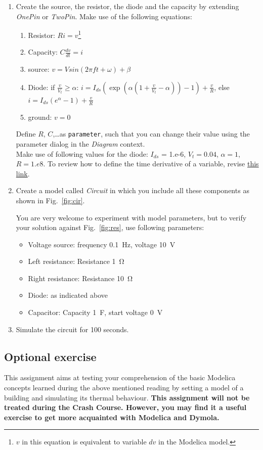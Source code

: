 \documentclass[10pt,a4paper]{article}
\begin{document}
\begin{enumerate}
	\item Create the source, the resistor, the diode and the capacity by extending \textit{OnePin} or \textit{TwoPin}. Make use of the following equations:
	\begin{enumerate}
		\item Resistor: $R i = v$\footnote{$v$ in this equation is equivalent to variable $dv$ in the Modelica model.}
		\item Capacity: $C \frac{d v}{dt} = i$
		\item source: $v = V sin( 2 \pi f t + \omega) + \beta$
		\item Diode: if $ \frac{v}{V_t} \geq \alpha$: $i = I_{ds} \left( \exp\left(\alpha \left( 1 + \frac{v}{V_t} - \alpha \right)\right) - 1\right) + \frac{v}{R}$, else $i = I_{ds} (e^\alpha - 1) + \frac{v}{R}$
		\item ground: $ v = 0$
	\end{enumerate}
	Define $R$, $C$,\ldots as \texttt{parameter}, such that you can change their value using the parameter dialog in the \textit{Diagram} context.\\
	Make use of following values for the diode: $I_{ds}$ = 1.e-6, $V_t=0.04$, 
	$\alpha=1$, $R=1.e8$.
	To review how to define the time derivative of a variable, revise 
	\href{http://book.xogeny.com/behavior/equations/first_order/}{this link}.
	\item Create a model called \textit{Circuit} in which you include all these 
	components as shown in Fig.~\ref{fig:cir}.
	
	You are very welcome to experiment with model parameters, but to verify 
	your solution against Fig.~\ref{fig:res}, use following parameters:
	\begin{itemize}
		\item Voltage source: frequency \SI{0.1}{\hertz}, voltage \SI{10}{\volt}
		\item Left resistance: Resistance \SI{1}{\ohm}
		\item Right resistance: Resistance \SI{10}{\ohm}
		\item Diode: as indicated above
		\item Capacitor: Capacity \SI{1}{\farad}, start voltage \SI{0}{\volt}
	\end{itemize}
	\item Simulate the circuit for 100 seconds.
\end{enumerate}

\subsection*{Optional exercise}
This assignment aims at testing your comprehension of the basic Modelica concepts learned during the above mentioned reading by setting a model of a building and simulating its thermal behaviour. \textbf{This assignment will not be treated during the Crash Course. However, you may find it a useful exercise to get more acquainted with Modelica and Dymola.}
\end{document}
